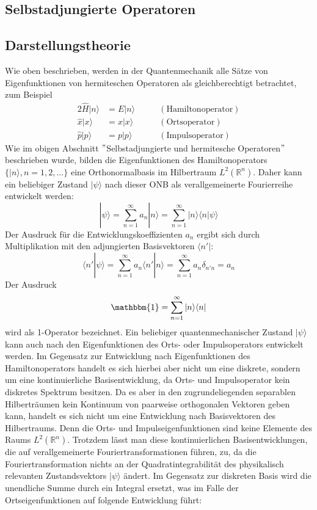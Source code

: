 \documentclass[9pt]{report}
\begin{document}
\subsection{Selbstadjungierte Operatoren}




\subsection{Darstellungstheorie}
Wie oben beschrieben, werden in der Quantenmechanik alle Sätze von Eigenfunktionen von hermiteschen Operatoren als gleichberechtigt betrachtet, zum Beispiel
\begin{alignat*}{2}
\hat{H}|n\rangle&=E|n\rangle\qquad&(\mathrm{Hamiltonoperator})\\
\hat{x}|x\rangle&=x|x\rangle\qquad&(\mathrm{Ortsoperator})\\
\hat{p}|p\rangle&=p|p\rangle\qquad&(\mathrm{Impulsoperator})
\end{alignat*}
Wie im obigen Abschnitt $"$Selbstadjungierte und hermitesche Operatoren$"$ beschrieben wurde, bilden die Eigenfunktionen des Hamiltonoperators $\{|n\rangle,n=1,2,...\}$ eine Orthonormalbasis im Hilbertraum $L^2(\mathbb{R}^{n})$. Daher kann ein beliebiger Zustand $|\psi\rangle$ nach dieser ONB als verallgemeinerte Fourierreihe entwickelt werden:
\begin{equation}
|\psi\rangle=\sum_{n=1}^{\infty}a_{n}|n\rangle=\sum_{n=1}^{\infty}|n\rangle\langle n|\psi\rangle
\end{equation}
Der Ausdruck für die Entwicklungskoeffizienten $a_{n}$ ergibt sich durch Multiplikation mit den adjungierten Basisvektoren $\langle n'|$:
\begin{equation}
\langle n'|\psi\rangle=\sum_{n=1}^{\infty}a_{n}\langle n'|n\rangle=\sum_{n=1}^{\infty}a_{n}\delta_{n'n}=a_{n}
\end{equation}
Der Ausdruck
\begin{equation}
\mathbbm{1}=\sum_{n=1}^{\infty}|n\rangle\langle n|
\end{equation}
wird als 1-Operator bezeichnet. Ein beliebiger quantenmechanischer Zustand $|\psi\rangle$ kann auch nach den Eigenfunktionen des Orts- oder Impulsoperators entwickelt werden. Im Gegensatz zur Entwicklung nach Eigenfunktionen des Hamiltonoperators handelt es sich hierbei aber nicht um eine diskrete, sondern um eine kontinuierliche Basisentwicklung, da Orts- und Impulsoperator kein diskretes Spektrum besitzen. Da es aber in den zugrundeliegenden separablen Hilberträumen kein Kontinuum von paarweise orthogonalen Vektoren geben kann, handelt es sich nicht um eine Entwicklung nach Basisvektoren des Hilbertraums. Denn die Orts- und Impulseigenfunktionen sind keine Elemente des Raums $L^2(\mathbb{R}^{n})$. Trotzdem lässt man diese kontinuierlichen Basisentwicklungen, die auf verallgemeinerte Fouriertransformationen führen, zu, da die Fouriertransformation nichts an der Quadratintegrabilität des physikalisch relevanten Zustandsvektors $|\psi\rangle$ ändert. Im Gegensatz zur diskreten Basis wird die unendliche Summe durch ein Integral ersetzt, was im Falle der Ortseigenfunktionen auf folgende Entwicklung führt:
\end{document}
